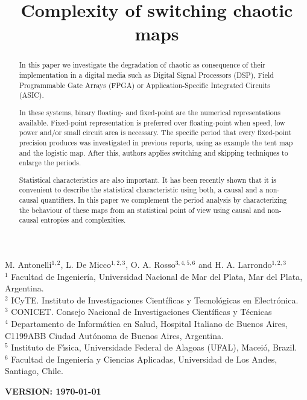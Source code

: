 \begin{frontmatter}

	\title{Complexity of switching chaotic maps}
	M. Antonelli$^{1,2}$, L. De Micco$^{1,2,3}$, O. A. Rosso$^{3,4,5,6}$ and H. A. Larrondo$^{1,2,3}$\\
	$^{1}$ Facultad de Ingenier\'ia, Universidad Nacional de Mar del Plata, Mar del Plata, Argentina.\\
	$^{2}$ ICyTE. Instituto de Investigaciones Científicas y Tecnológicas en Electrónica.\\
	$^{3}$ CONICET. Consejo Nacional de Investigaciones Científicas y Técnicas\\
	$^{4}$ Departamento de Inform\'atica en Salud, Hospital Italiano de Buenos Aires, C1199ABB Ciudad Autónoma de Buenos Aires, Argentina.\\
	$^{5}$ Instituto de F\'{\i}sica, Universidade Federal de Alagoas (UFAL), Macei\'o, Brazil.\\
	$^{6}$ Facultad de Ingeniería y Ciencias Aplicadas, Universidad de Los Andes, Santiago, Chile.
	

\begin{abstract}

In this paper we investigate the degradation of chaotic as consequence of their implementation in a digital media such as Digital Signal Processors (DSP), Field Programmable Gate Arrays (FPGA) or Application-Specific Integrated Circuits (ASIC).

In these systems, binary floating- and fixed-point are the numerical representations available.
Fixed-point representation is preferred over floating-point when speed, low power and/or small circuit area is necessary.
The specific period that every fixed-point precision produces was investigated in previous reports, using as example the tent map and the logistic map.
After this, authors applies switching and skipping techniques to enlarge the periods.

Statistical characteristics are also important.
It has been recently shown that it is convenient to describe the statistical characteristic using both, a causal and a non-causal quantifiers.
In this paper we complement the period analysis by characterizing the behaviour of these maps from an statistical point of view using causal and non-causal entropies and complexities.

\end{abstract}
\maketitle
\end{frontmatter}
{\bf VERSION: \today}